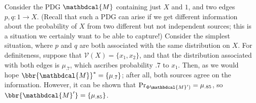 \documentclass[letterpaper]{article} %
\theoremstyle{plain}
\theoremstyle{definition}
\theoremstyle{remark}
\newcommand{\V}{\mathcal V}
\newcommand{\dg}[1]{\mathbdcal{#1}}
\newcommand{\IDef}[1]{\mathit{IDef}_{#1}}
\begin{document}
\begin{example}\label{ex:overdet}
Consider the PDG $\dg M$ containing just $X$ and $1$, and two edges
$p, q: 1 \to X$.
(Recall that such a PDG can arise if we get different information about the
probability of $X$ from two different 
but not independent
sources; this is a situation we
certainly want to be able to capture!)
Consider the simplest situation, where $p$ and $q$ are both associated
with the same distribution on $X$.  For definiteness, suppose that
$\V(X) = \{x_1,x_2\}$, 
%
%
%
and
that the distribution associated with both edges is $\mu_{.7}$, which ascribes
probability $.7$ to $x_1$. Then, as we would hope  $\bbr{\dg M}^* =
\{\mu_{.7}\}$; after all, both sources agree on the information.
However, it can be shown that 
$\Pr_{\Phi{{\dg M')}}} = \mu_{.85}$, so  $\bbr{\dg M'} = \{\mu_{.85}\}$.
\end{example}
\end{document}
